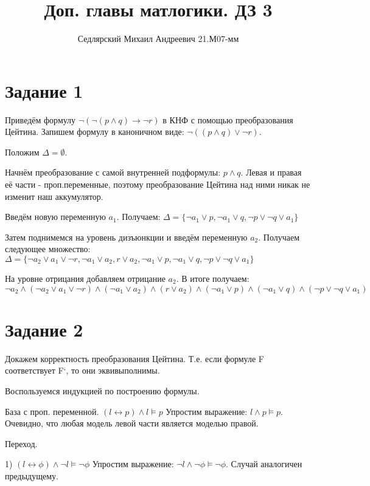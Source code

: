 \documentclass{article}
\title{Доп. главы матлогики. ДЗ 3}
\author{Седлярский Михаил Андреевич 21.М07-мм}
\date{ }
\begin{document}
\maketitle

\section*{Задание 1}
Приведём формулу \(\neg(\neg(p \land q) \rightarrow \neg r)\) в КНФ с помощью преобразования Цейтина.
Запишем формулу в каноничном виде: \(\neg((p \land q) \lor \neg r)\).

Положим \(\Delta = \emptyset\).

Начнём преобразование с самой внутренней подформулы: \(p \land q\).
Левая и правая её части - проп.переменные, поэтому преобразование Цейтина
над ними никак не  изменит наш аккумулятор.

Введём новую переменную \(a_1\). Получаем: \(
    \Delta = \{
        \neg a_1 \lor p,
        \neg a_1 \lor q,
        \neg p \lor \neg q \lor a_1 
    \}
\)

Затем поднимемся на уровень дизъюнкции и введём переменную \(a_2\).
Получаем следующее множество: \(
    \Delta = \{
        \neg a_2 \lor a_1 \lor \neg r,
        \neg a_1 \lor a_2,
        r \lor a_2,
        \neg a_1 \lor p,
        \neg a_1 \lor q,
        \neg p \lor \neg q \lor a_1 
    \}
\)

На уровне отрицания добавляем отрицание \(a_2\). 
В итоге получаем:
\[
    \neg a_2
    \land  (\neg a_2 \lor a_1 \lor \neg r)
    \land (\neg a_1 \lor a_2)
    \land (r \lor a_2)
    \land (\neg a_1 \lor p)
    \land (\neg a_1 \lor q)
    \land (\neg p \lor \neg q \lor a_1)
\]

\section*{Задание 2}
Докажем корректность преобразования Цейтина. 
Т.е. если формуле F соответствует F`, то они эквивыполнимы.

Воспользуемся индукцией по построению формулы.

База с проп. переменной.
\((l \leftrightarrow p) \land l \models p\)
Упростим выражение: \(l \land p \models p\). 
Очевидно, что любая модель левой части является моделью правой.

Переход.

1) \((l \leftrightarrow \phi) \land \neg l \models \neg \phi\)
Упростим выражение: \(\neg l \land \neg \phi \models \neg \phi\).
Случай аналогичен предыдущему.
\end{document}
